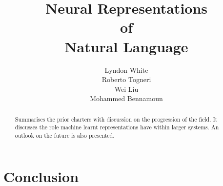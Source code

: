\documentclass[12pt,parskip]{komatufte}
\begin{document}
\title{Neural Representations \\of\\ Natural Language}
\author{Lyndon White\\ Roberto Togneri\\ Wei Liu\\ Mohammed Bennamoun}
\publishers{SpringerBriefs in Computer Science}


\maketitle

\tableofcontents













\chapter{Conclusion}\label{sec:conclusion}
\begin{abstract}
Summarises the prior charters with discussion on the progression of the field.
It discusses the role machine learnt representations have within larger systems.
An outlook on the future is also presented.
\end{abstract}

\clearpage
{}
\printbibliography
\end{document}
